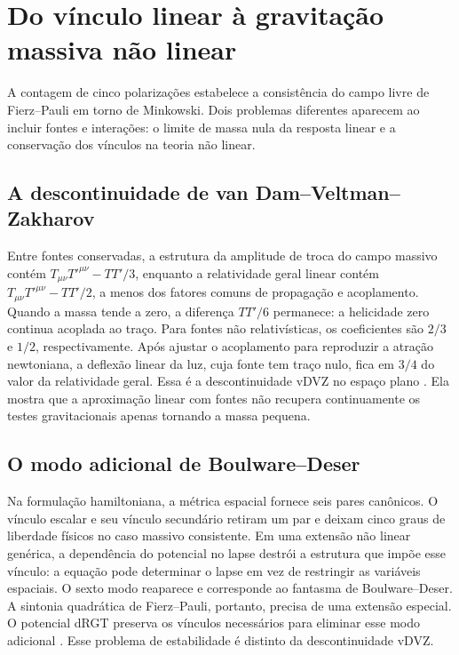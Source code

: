 \section{Do vínculo linear à gravitação massiva não linear}
\label{sec:fund-naolinear}

A contagem de cinco polarizações estabelece a consistência do campo livre de Fierz--Pauli em torno de Minkowski. Dois problemas diferentes aparecem ao incluir fontes e interações: o limite de massa nula da resposta linear e a conservação dos vínculos na teoria não linear.

\subsection{A descontinuidade de van Dam--Veltman--Zakharov}

Entre fontes conservadas, a estrutura da amplitude de troca do campo massivo contém $T_{\mu\nu}T'^{\mu\nu}-TT'/3$, enquanto a relatividade geral linear contém $T_{\mu\nu}T'^{\mu\nu}-TT'/2$, a menos dos fatores comuns de propagação e acoplamento. Quando a massa tende a zero, a diferença $TT'/6$ permanece: a helicidade zero continua acoplada ao traço. Para fontes não relativísticas, os coeficientes são $2/3$ e $1/2$, respectivamente. Após ajustar o acoplamento para reproduzir a atração newtoniana, a deflexão linear da luz, cuja fonte tem traço nulo, fica em $3/4$ do valor da relatividade geral. Essa é a descontinuidade vDVZ no espaço plano \autocite{hinterbichler2012}. Ela mostra que a aproximação linear com fontes não recupera continuamente os testes gravitacionais apenas tornando a massa pequena.

\subsection{O modo adicional de Boulware--Deser}

Na formulação hamiltoniana, a métrica espacial fornece seis pares canônicos. O vínculo escalar e seu vínculo secundário retiram um par e deixam cinco graus de liberdade físicos no caso massivo consistente. Em uma extensão não linear genérica, a dependência do potencial no lapse destrói a estrutura que impõe esse vínculo: a equação pode determinar o lapse em vez de restringir as variáveis espaciais. O sexto modo reaparece e corresponde ao fantasma de Boulware--Deser. A sintonia quadrática de Fierz--Pauli, portanto, precisa de uma extensão especial. O potencial dRGT preserva os vínculos necessários para eliminar esse modo adicional \autocite{derham2014review,derham2011}. Esse problema de estabilidade é distinto da descontinuidade vDVZ.

